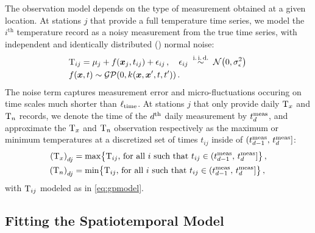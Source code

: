 \documentclass[12pt]{article}
\begin{document}
The observation model depends on the type of measurement obtained at a given location.
At stations \(j\) that provide a full temperature time series, we model the \(i^{\mathrm{th}}\) temperature record as a noisy measurement from the true time series, with independent and identically distributed (\iid{}) normal noise:
\begin{equation}
\begin{split}
    & \T_{ij} = \mu_{j} + f(\xvec_j, t_{ij}) + \epsilon_{ij}\,,\quad
    \epsilon_{ij} \overset{\mathiid}{\sim} \normal\del{0,\sigman^2}\,\\
    & f(\xvec, t) \sim \GP\del{0, k_{}(\xvec,\xvec',t,t')}\,.\\
\end{split}
\label{eq:gpmodel}
\end{equation}
The noise term captures measurement error and micro-fluctuations occuring on time scales much shorter than \(\ell_{\mathrm{time}}\).
At stations \(j\) that only provide daily \(\mathrm{T}_{x}\) and \(\mathrm{T}_{n}\) records, 
we denote the time of the \(d^{\mathrm{th}}\) daily measurement by \(t^{\mathrm{meas}}_{d}\), 
and approximate the \(\mathrm{T}_{x}\) and \(\mathrm{T}_{n}\) observation respectively as the maximum or minimum temperatures at a discretized set of times \(t_{ij}\) inside of \((t^{\mathrm{meas}}_{d-1},\,t^{\mathrm{meas}}_{d}]\):
\begin{equation}
\begin{split}
    \del{\Tx}_{\iday j} &= \max\cbr{\T_{ij}\text{, for all \(i\) such that } t_{ij} \in \dayset{\iday}} \,,\\
    \del{\Tn}_{\iday j} &= \min\cbr{\T_{ij}\text{, for all \(i\) such that } t_{ij} \in \dayset{\iday}} \,,
\end{split}
\label{eq:obs_Tn_Tx}
\end{equation}
with \(\mathrm{T}_{ij}\) modeled as in \autoref{eq:gpmodel}.

\subsection{Fitting the Spatiotemporal Model}\label{fitting-the-spatiotemporal-model}
\end{document}
